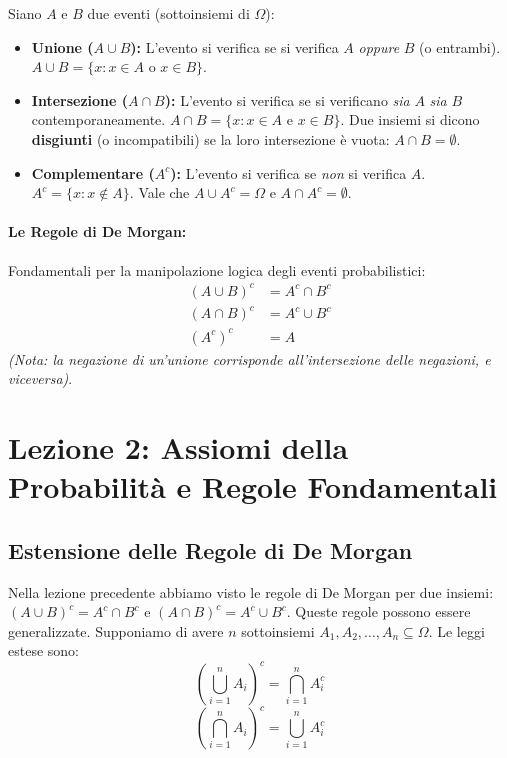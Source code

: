 \documentclass[12pt, a4paper]{article}
\begin{document}
Siano $A$ e $B$ due eventi (sottoinsiemi di $\Omega$):
\begin{itemize}
    \item \textbf{Unione ($A \cup B$):} L'evento si verifica se si verifica $A$ \textit{oppure} $B$ (o entrambi). $A \cup B = \{x : x \in A \text{ o } x \in B\}$.
    \item \textbf{Intersezione ($A \cap B$):} L'evento si verifica se si verificano \textit{sia} $A$ \textit{sia} $B$ contemporaneamente. $A \cap B = \{x : x \in A \text{ e } x \in B\}$. Due insiemi si dicono \textbf{disgiunti} (o incompatibili) se la loro intersezione è vuota: $A \cap B = \emptyset$.
    \item \textbf{Complementare ($A^c$):} L'evento si verifica se \textit{non} si verifica $A$. $A^c = \{x : x \notin A\}$. Vale che $A \cup A^c = \Omega$ e $A \cap A^c = \emptyset$.
\end{itemize}

\paragraph{Le Regole di De Morgan:}
Fondamentali per la manipolazione logica degli eventi probabilistici:
\begin{align*}
    (A \cup B)^c &= A^c \cap B^c \\
    (A \cap B)^c &= A^c \cup B^c \\
    (A^c)^c &= A
\end{align*}
\textit{(Nota: la negazione di un'unione corrisponde all'intersezione delle negazioni, e viceversa)}.

\section{Lezione 2: Assiomi della Probabilità e Regole Fondamentali}

\subsection{Estensione delle Regole di De Morgan}
Nella lezione precedente abbiamo visto le regole di De Morgan per due insiemi: $(A \cup B)^c = A^c \cap B^c$ e $(A \cap B)^c = A^c \cup B^c$.
Queste regole possono essere generalizzate. Supponiamo di avere $n$ sottoinsiemi $A_1, A_2, \dots, A_n \subseteq \Omega$. Le leggi estese sono:
$$ \left(\bigcup_{i=1}^n A_i\right)^c = \bigcap_{i=1}^n A_i^c $$ 
$$ \left(\bigcap_{i=1}^n A_i\right)^c = \bigcup_{i=1}^n A_i^c $$ 
\end{document}
